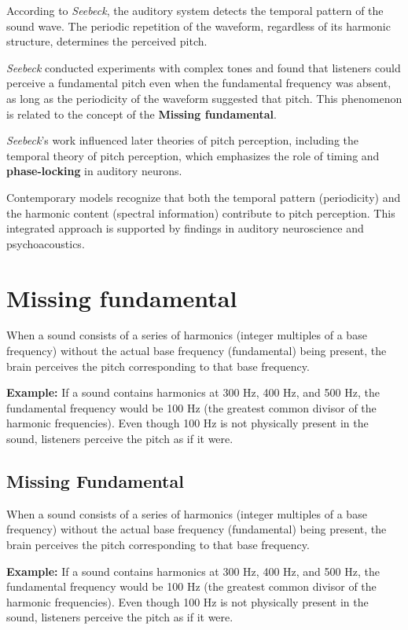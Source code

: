 \documentclass{article}
\begin{document}
According to \textit{Seebeck}, the auditory system detects the temporal pattern of the sound wave. The periodic repetition of the waveform, regardless of its harmonic structure, determines the perceived pitch.

\textit{Seebeck} conducted experiments with complex tones and found that listeners could perceive a fundamental pitch even when the fundamental frequency was absent, as long as the periodicity of the waveform suggested that pitch. This phenomenon is related to the concept of the \textbf{Missing fundamental}.

\textit{Seebeck}'s work influenced later theories of pitch perception, including the temporal theory of pitch perception, which emphasizes the role of timing and \textbf{phase-locking} in auditory neurons.

Contemporary models recognize that both the temporal pattern (periodicity) and the harmonic content (spectral information) contribute to pitch perception. This integrated approach is supported by findings in auditory neuroscience and psychoacoustics.

\section{Missing fundamental}

When a sound consists of a series of harmonics (integer multiples of a base frequency) without the actual base frequency (fundamental) being present, the brain perceives the pitch corresponding to that base frequency.

\textbf{Example:} If a sound contains harmonics at 300 Hz, 400 Hz, and 500 Hz, the fundamental frequency would be 100 Hz (the greatest common divisor of the harmonic frequencies). Even though 100 Hz is not physically present in the sound, listeners perceive the pitch as if it were.


\subsection{Missing Fundamental}
When a sound consists of a series of harmonics (integer multiples of a base frequency) without the actual base frequency (fundamental) being present, the brain perceives the pitch corresponding to that base frequency.

\textbf{Example:} If a sound contains harmonics at 300 Hz, 400 Hz, and 500 Hz, the fundamental frequency would be 100 Hz (the greatest common divisor of the harmonic frequencies). Even though 100 Hz is not physically present in the sound, listeners perceive the pitch as if it were.
\end{document}

